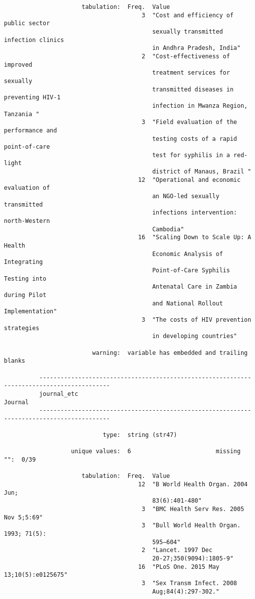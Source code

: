 \documentclass{article}
\begin{document}
\begin{verbatim}
                      tabulation:  Freq.  Value
                                       3  "Cost and efficiency of public sector
                                          sexually transmitted infection clinics
                                          in Andhra Pradesh, India"
                                       2  "Cost-effectiveness of improved
                                          treatment services for sexually
                                          transmitted diseases in preventing HIV-1
                                          infection in Mwanza Region, Tanzania "
                                       3  "Field evaluation of the performance and
                                          testing costs of a rapid point-of-care
                                          test for syphilis in a red-light
                                          district of Manaus, Brazil "
                                      12  "Operational and economic evaluation of
                                          an NGO-led sexually transmitted
                                          infections intervention: north-Western
                                          Cambodia"
                                      16  "Scaling Down to Scale Up: A Health
                                          Economic Analysis of Integrating
                                          Point-of-Care Syphilis Testing into
                                          Antenatal Care in Zambia during Pilot
                                          and National Rollout Implementation"
                                       3  "The costs of HIV prevention strategies
                                          in developing countries"
          
                         warning:  variable has embedded and trailing blanks
          
          ------------------------------------------------------------------------------------------
          journal_etc                                                                        Journal
          ------------------------------------------------------------------------------------------
          
                            type:  string (str47)
          
                   unique values:  6                        missing "":  0/39
          
                      tabulation:  Freq.  Value
                                      12  "B World Health Organ. 2004 Jun;
                                          83(6):401-480"
                                       3  "BMC Health Serv Res. 2005 Nov 5;5:69"
                                       3  "Bull World Health Organ. 1993; 71(5):
                                          595–604"
                                       2  "Lancet. 1997 Dec
                                          20-27;350(9094):1805-9"
                                      16  "PLoS One. 2015 May 13;10(5):e0125675"
                                       3  "Sex Transm Infect. 2008
                                          Aug;84(4):297-302."
          

\end{verbatim}
\end{document}
